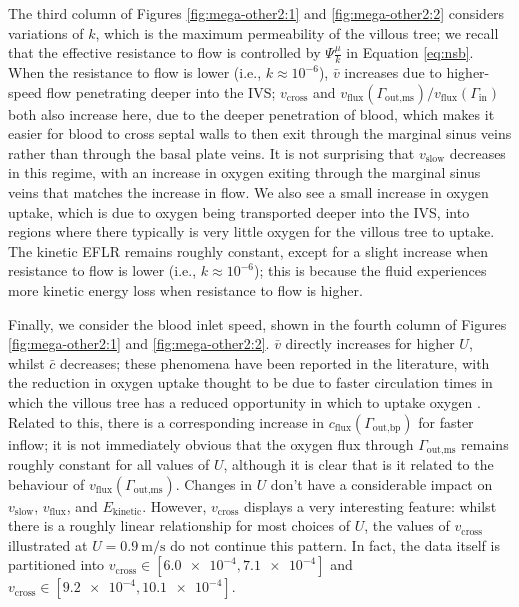             The third column of Figures \ref{fig:mega-other2:1} and \ref{fig:mega-other2:2} considers variations of $k$, which is the maximum permeability of the villous tree; we recall that the effective resistance to flow is controlled by $\Psi \frac{\mu}{k}$ in Equation \eqref{eq:nsb}. When the resistance to flow is lower (i.e., $k \approx 10^{-6}$), $\bar{v}$ increases due to higher-speed flow penetrating deeper into the IVS; $v_\text{cross}$ and $v_\text{flux}(\Gamma_\text{out,ms})/v_\text{flux}(\Gamma_\text{in})$ both also increase here, due to the deeper penetration of blood, which makes it easier for blood to cross septal walls to then exit through the marginal sinus veins rather than through the basal plate veins. It is not surprising that $v_\text{slow}$ decreases in this regime, with an increase in oxygen exiting through the marginal sinus veins that matches the increase in flow. We also see a small increase in oxygen uptake, which is due to oxygen being transported deeper into the IVS, into regions where there typically is very little oxygen for the villous tree to uptake. The kinetic EFLR remains roughly constant, except for a slight increase when resistance to flow is lower (i.e., $k \approx 10^{-6}$); this is because the fluid experiences more kinetic energy loss when resistance to flow is higher.

            Finally, we consider the blood inlet speed, shown in the fourth column of Figures \ref{fig:mega-other2:1} and \ref{fig:mega-other2:2}. $\bar{v}$ directly increases for higher $U$, whilst $\bar{c}$ decreases; these phenomena have been reported in the literature, with the reduction in oxygen uptake thought to be due to faster circulation times in which the villous tree has a reduced opportunity in which to uptake oxygen \cite{burtonRheologicalPhysiologicalConsequences2009}. Related to this, there is a corresponding increase in $c_\text{flux}(\Gamma_\text{out,bp})$ for faster inflow; it is not immediately obvious that the oxygen flux through $\Gamma_\text{out,ms}$ remains roughly constant for all values of $U$, although it is clear that is it related to the behaviour of $v_\text{flux}(\Gamma_\text{out,ms})$. Changes in $U$ don't have a considerable impact on $v_\text{slow}$, $v_\text{flux}$, and $E_\text{kinetic}$. However, $v_\text{cross}$ displays a very interesting feature: whilst there is a roughly linear relationship for most choices of $U$, the values of $v_\text{cross}$ illustrated at $U = \qty{0.9}{\metre\per\second}$ do not continue this pattern. In fact, the data itself is partitioned into $v_\text{cross} \in [\num{6.0e-4}, \num{7.1e-4}]$ and $v_\text{cross} \in [\num{9.2e-4}, \num{10.1e-4}]$.

